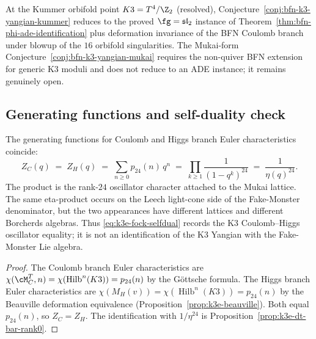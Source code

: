 \begin{remark}
\label{rem:bfn-kummer-reduces-to-a1}
At the Kummer orbifold point $K3 = T^4/\Z_2$ (resolved), Conjecture~\ref{conj:bfn-k3-yangian-kummer} reduces to the proved $\fg = \mathfrak{sl}_2$ instance of Theorem~\ref{thm:bfn-phi-ade-identification} plus deformation invariance of the BFN Coulomb branch under blowup of the $16$ orbifold singularities. The Mukai-form Conjecture~\ref{conj:bfn-k3-yangian-mukai} requires the non-quiver BFN extension for generic K3 moduli and does not reduce to an ADE instance; it remains genuinely open.
\end{remark}

\subsection{Generating functions and self-duality check}
\label{subsec:k3e-symplectic-genfunction}

\begin{proposition}
\label{prop:k3e-selfdual-fock}
The generating functions for Coulomb and Higgs branch Euler characteristics coincide:
\begin{equation}
\label{eq:k3e-fock-selfdual}
 Z_C(q) \;=\; Z_H(q)
 \;=\; \sum_{n \geq 0} p_{24}(n)\,q^n
 \;=\; \prod_{k \geq 1} \frac{1}{(1-q^k)^{24}}
 \;=\; \frac{1}{\eta(q)^{24}}.
\end{equation}
The product is the rank-$24$ oscillator character attached to the
Mukai lattice.  The same eta-product occurs on the Leech light-cone
side of the Fake-Monster denominator, but the two appearances have
different lattices and different Borcherds algebras.  Thus
\eqref{eq:k3e-fock-selfdual} records the K3 Coulomb--Higgs
oscillator equality; it is not an identification of the K3 Yangian
with the Fake-Monster Lie algebra.
\end{proposition}

\begin{proof}
The Coulomb branch Euler characteristics are $\chi(\cM_C^T, n) = \chi(\operatorname{Hilb}^n(K3)) = p_{24}(n)$ by the G\"ottsche formula. The Higgs branch Euler characteristics are $\chi(M_H(v)) = \chi(\operatorname{Hilb}^n(K3)) = p_{24}(n)$ by the Beauville deformation equivalence (Proposition~\ref{prop:k3e-beauville}). Both equal $p_{24}(n)$, so $Z_C = Z_H$. The identification with $1/\eta^{24}$ is Proposition~\ref{prop:k3e-dt-bar-rank0}.
\end{proof}

